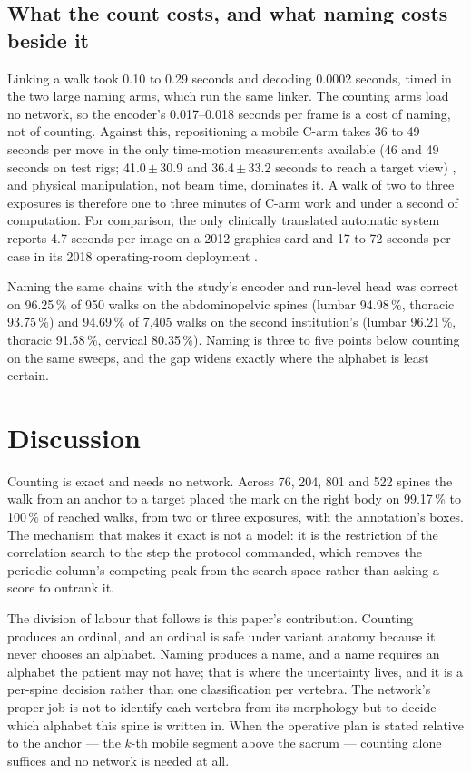 \documentclass[11pt,letterpaper]{article}
\newcommand{\pc}[1]{#1\,\%}
\begin{document}
\subsection*{What the count costs, and what naming costs beside it}

Linking a walk took 0.10 to 0.29 seconds and decoding 0.0002 seconds, timed in the two large naming arms,
which run the same linker.
The counting arms load no network, so the encoder's 0.017--0.018 seconds per frame is a cost of naming, not
of counting. Against this, repositioning a mobile C-arm takes 36 to 49 seconds per move in the only
time-motion measurements available (46 and 49 seconds on test rigs; 41.0\,$\pm$\,30.9 and
36.4\,$\pm$\,33.2 seconds to reach a target view) \citep{matthews2007,desilva2018}, and physical
manipulation, not beam time, dominates it. A walk
of two to three exposures is therefore one to three minutes of C-arm work and under a second of computation.
For comparison, the only clinically translated automatic system reports 4.7 seconds per image on a 2012
graphics card and 17 to 72 seconds per case in its 2018 operating-room deployment
\citep{levelcheck2012,otake2015}.

Naming the same chains with the study's encoder and run-level head was correct on \pc{96.25} of 950 walks
on the abdominopelvic spines (lumbar \pc{94.98}, thoracic \pc{93.75}) and \pc{94.69} of 7,405 walks on the
second institution's (lumbar \pc{96.21}, thoracic \pc{91.58}, cervical \pc{80.35}). Naming is three to five
points below counting on the same sweeps, and the gap widens exactly where the alphabet is least certain.

\section*{Discussion}

Counting is exact and needs no network. Across 76, 204, 801 and 522 spines the walk from an anchor to a
target placed the mark on the right body on \pc{99.17} to \pc{100} of reached walks, from two or three
exposures, with the annotation's boxes. The mechanism that makes it exact is not a model: it is the
restriction of the correlation search to the step the protocol commanded, which removes the periodic
column's competing peak from the search space rather than asking a score to outrank it.

The division of labour that follows is this paper's contribution. Counting produces an ordinal, and an
ordinal is safe under variant anatomy because it never chooses an alphabet. Naming produces a name, and a
name requires an alphabet the patient may not have; that is where the uncertainty lives, and it is a
per-spine decision rather than one classification per vertebra. The network's proper job is not to identify each
vertebra from its morphology but to decide which alphabet this spine is written in. When the operative plan
is stated relative to the anchor --- the $k$-th mobile segment above the sacrum --- counting alone suffices
and no network is needed at all.
\end{document}
